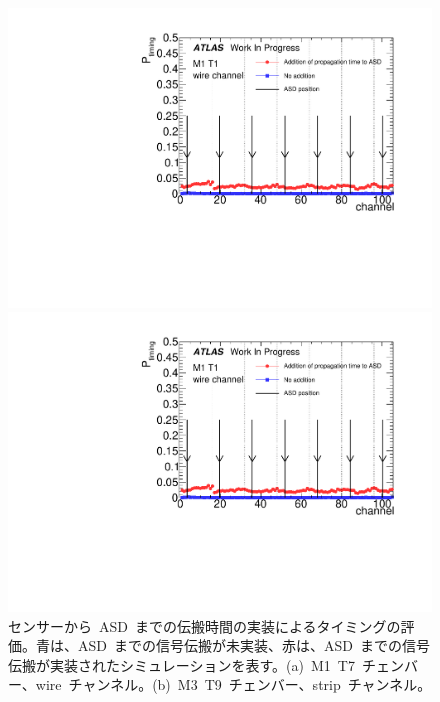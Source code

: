 \begin{figure}[H]
    \begin{minipage}{0.49\hsize}
    \centering   
    \includegraphics[width=\textwidth,page=8]{img/plot/ASD.pdf}
    \subcaption{}
    \end{minipage}
    \begin{minipage}{0.49\hsize}
    \centering   
    \includegraphics[width=\textwidth,page=35]{img/plot/ASD.pdf}
    \subcaption{}
    \end{minipage}
    \caption[センサーから~ASD~までの伝搬時間の実装によるタイミングの評価]{センサーから~ASD~までの伝搬時間の実装によるタイミングの評価。青は、ASD~までの信号伝搬が未実装、赤は、ASD~までの信号伝搬が実装されたシミュレーションを表す。(a)~M1~T7~チェンバー、wire~チャンネル。(b)~M3~T9~チェンバー、strip~チャンネル。}
    \label{fig:asd}
\end{figure}

